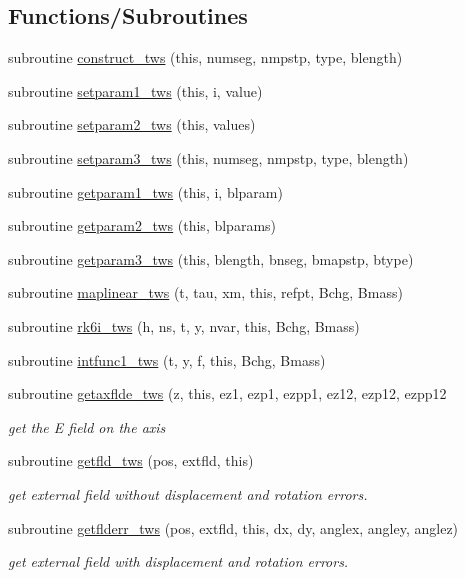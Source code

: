 \subsection*{Functions/\+Subroutines}
\begin{DoxyCompactItemize}
\item 
subroutine \mbox{\hyperlink{namespacetwsclass_a6528e082bfe1d870e027de8353b312c7}{construct\+\_\+tws}} (this, numseg, nmpstp, type, blength)
\item 
subroutine \mbox{\hyperlink{namespacetwsclass_a15770a288893203a1f18bde3f1ab190c}{setparam1\+\_\+tws}} (this, i, value)
\item 
subroutine \mbox{\hyperlink{namespacetwsclass_a24b51ee452bd448a84120562cb38c085}{setparam2\+\_\+tws}} (this, values)
\item 
subroutine \mbox{\hyperlink{namespacetwsclass_acdc918f464e4b8dbf86ea0e00b0d7335}{setparam3\+\_\+tws}} (this, numseg, nmpstp, type, blength)
\item 
subroutine \mbox{\hyperlink{namespacetwsclass_ac410f8e4606b3fdf3303f0976a2115dc}{getparam1\+\_\+tws}} (this, i, blparam)
\item 
subroutine \mbox{\hyperlink{namespacetwsclass_a82176cb7e562eb7a78fffed55cbac554}{getparam2\+\_\+tws}} (this, blparams)
\item 
subroutine \mbox{\hyperlink{namespacetwsclass_a07f751992638ce181255eef670d54c50}{getparam3\+\_\+tws}} (this, blength, bnseg, bmapstp, btype)
\item 
subroutine \mbox{\hyperlink{namespacetwsclass_ab57cbdca9514adc28eb62c6bbb8633b6}{maplinear\+\_\+tws}} (t, tau, xm, this, refpt, Bchg, Bmass)
\item 
subroutine \mbox{\hyperlink{namespacetwsclass_a2d527684d5c9fd42e3217ac03914bd90}{rk6i\+\_\+tws}} (h, ns, t, y, nvar, this, Bchg, Bmass)
\item 
subroutine \mbox{\hyperlink{namespacetwsclass_a1681f57f6e70160ddb0f6e59f4cd5349}{intfunc1\+\_\+tws}} (t, y, f, this, Bchg, Bmass)
\item 
subroutine \mbox{\hyperlink{namespacetwsclass_a9c88e1753c1d3faff3af95cf8c071d4f}{getaxflde\+\_\+tws}} (z, this, ez1, ezp1, ezpp1, ez12, ezp12, ezpp12
\begin{DoxyCompactList}\small\item\em get the E field on the axis \end{DoxyCompactList}\item 
subroutine \mbox{\hyperlink{namespacetwsclass_a30d73a1ffc1ce8ce728e8fdf7caa6002}{getfld\+\_\+tws}} (pos, extfld, this)
\begin{DoxyCompactList}\small\item\em get external field without displacement and rotation errors. \end{DoxyCompactList}\item 
subroutine \mbox{\hyperlink{namespacetwsclass_aaf9be4899e2515903618d2a1ab1dfbbc}{getflderr\+\_\+tws}} (pos, extfld, this, dx, dy, anglex, angley, anglez)
\begin{DoxyCompactList}\small\item\em get external field with displacement and rotation errors. \end{DoxyCompactList}\end{DoxyCompactItemize}
